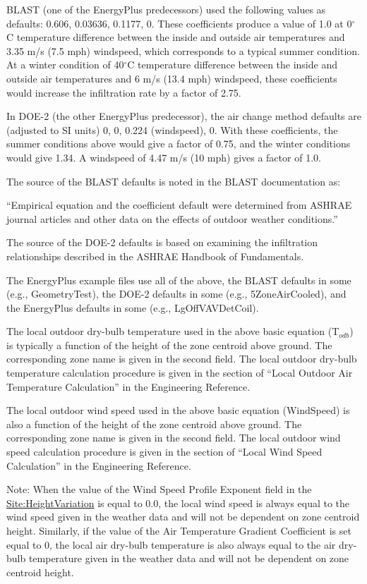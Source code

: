 BLAST (one of the EnergyPlus predecessors) used the following values as defaults: 0.606, 0.03636, 0.1177, 0. These coefficients produce a value of 1.0 at 0$^\circ$C temperature difference between the inside and outside air temperatures and 3.35 m/s (7.5 mph) windspeed, which corresponds to a typical summer condition. At a winter condition of 40$^\circ$C temperature difference between the inside and outside air temperatures and 6 m/s (13.4 mph) windspeed, these coefficients would increase the infiltration rate by a factor of 2.75.

In DOE-2 (the other EnergyPlus predecessor), the air change method defaults are (adjusted to SI units) 0, 0, 0.224 (windspeed), 0. With these coefficients, the summer conditions above would give a factor of 0.75, and the winter conditions would give 1.34. A windspeed of 4.47 m/s (10 mph) gives a factor of 1.0.

The source of the BLAST defaults is noted in the BLAST documentation as:

``Empirical equation and the coefficient default were determined from ASHRAE journal articles and other data on the effects of outdoor weather conditions.''

The source of the DOE-2 defaults is based on examining the infiltration relationships described in the ASHRAE Handbook of Fundamentals.

The EnergyPlus example files use all of the above, the BLAST defaults in some (e.g., GeometryTest), the DOE-2 defaults in some (e.g., 5ZoneAirCooled), and the EnergyPlus defaults in some (e.g., LgOffVAVDetCoil).

The local outdoor dry-bulb temperature used in the above basic equation (T\(_{odb}\)) is typically a function of the height of the zone centroid above ground. The corresponding zone name is given in the second field. The local outdoor dry-bulb temperature calculation procedure is given in the section of ``Local Outdoor Air Temperature Calculation'' in the Engineering Reference.

The local outdoor wind speed used in the above basic equation (WindSpeed) is also a function of the height of the zone centroid above ground. The corresponding zone name is given in the second field. The local outdoor wind speed calculation procedure is given in the section of ``Local Wind Speed Calculation'' in the Engineering Reference.

\begin{callout}
  Note: When the value of the Wind Speed Profile Exponent field in the \hyperref[siteheightvariation]{Site:HeightVariation} is equal to 0.0, the local wind speed is always equal to the wind speed given in the weather data and will not be dependent on zone centroid height. Similarly, if the value of the Air Temperature Gradient Coefficient is set equal to 0, the local air dry-bulb temperature is also always equal to the air dry-bulb temperature given in the weather data and will not be dependent on zone centroid height.
\end{callout}

